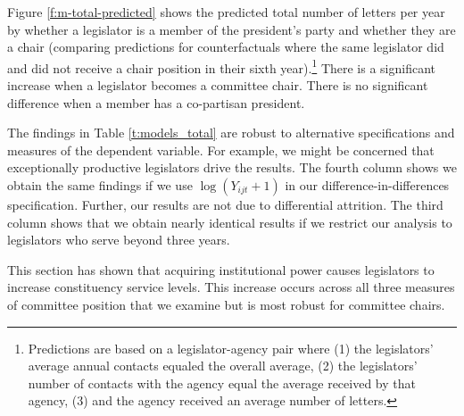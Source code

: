 \documentclass[12pt]{article}
\begin{document}
Figure \ref{f:m-total-predicted} shows the predicted total number of letters per year by whether a legislator is a member of the president's party and whether they are a chair (comparing predictions for counterfactuals where the same legislator did and did not receive a chair position in their sixth year).\footnote{Predictions are based on a legislator-agency pair where (1) the legislators' average annual contacts equaled the overall average, (2) the legislators' number of contacts with the agency equal the average received by that agency, (3) and the agency received an average number of letters.} 
There is a significant increase when a legislator becomes a committee chair. There is no significant difference when a member has a co-partisan president.

The findings in Table \ref{t:models_total} are robust to alternative specifications and measures of the dependent variable. For example, we might be concerned that exceptionally productive legislators drive the results. The fourth column shows we obtain the same findings if we use $\log (Y_{ijt} + 1)$ in our difference-in-differences specification. Further, our results are not due to differential attrition. The third column shows that we obtain nearly identical results if we restrict our analysis to legislators who serve beyond three years.    

This section has shown that acquiring institutional power causes legislators to increase constituency service levels. This increase occurs across all three measures of committee position that we examine but is most robust for committee chairs. 



\end{document}
